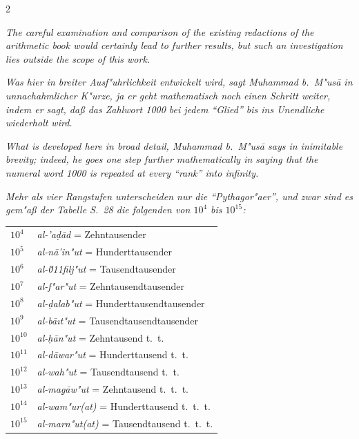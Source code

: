 \documentclass[10pt,a4paper]{article}
\newcommand{\enquote}[1]{``#1''}
\begin{document}
\begin{paracol}{2}
\switchcolumn

\textit{The careful examination and comparison of the existing redactions of the arithmetic book would certainly lead to further results, but such an investigation lies outside the scope of this work.}

\switchcolumn*

\textit{Was hier in breiter Ausf"uhrlichkeit entwickelt wird, sagt Muhammad b.\ M"us\=a in unnachahmlicher K"urze, ja er geht mathematisch noch einen Schritt weiter, indem er sagt, da\ss{} das Zahlwort 1000 bei jedem \enquote{Glied} bis ins Unendliche wiederholt wird.}

\switchcolumn

\textit{What is developed here in broad detail, Muhammad b.\ M"us\=a says in inimitable brevity; indeed, he goes one step further mathematically in saying that the numeral word 1000 is repeated at every \enquote{rank} into infinity.}

\switchcolumn*

\textit{Mehr als vier Rangstufen unterscheiden nur die \enquote{Pythagor"aer}, und zwar sind es gem"a\ss{} der Tabelle S.\ 28 die folgenden von $10^{4}$ bis $10^{15}$:}

\begin{center}
\begin{tabular}{ll}
$10^{4}$ & \textit{al-'a\d{d}\=ad} = Zehntausender \\
$10^{5}$ & \textit{al-n\=a'in"ut} = Hunderttausender \\
$10^{6}$ & \textit{al-\u011filj"ut} = Tausendtausender \\
$10^{7}$ & \textit{al-f"ar"ut} = Zehntausendtausender \\
$10^{8}$ & \textit{al-\d{d}alab"ut} = Hunderttausendtausender \\
$10^{9}$ & \textit{al-b\=a\i{}t"ut} = Tausendtausendtausender \\
$10^{10}$ & \textit{al-\d{h}\=an"ut} = Zehntausend t.\ t. \\
$10^{11}$ & \textit{al-d\=awar"ut} = Hunderttausend t.\ t. \\
$10^{12}$ & \textit{al-wah"ut} = Tausendtausend t.\ t. \\
$10^{13}$ & \textit{al-ma\d{g}\=aw"ut} = Zehntausend t.\ t.\ t. \\
$10^{14}$ & \textit{al-wam"ur(at)} = Hunderttausend t.\ t.\ t. \\
$10^{15}$ & \textit{al-marn"ut(at)} = Tausendtausend t.\ t.\ t.
\end{tabular}
\end{center}


\end{paracol}
\end{document}
